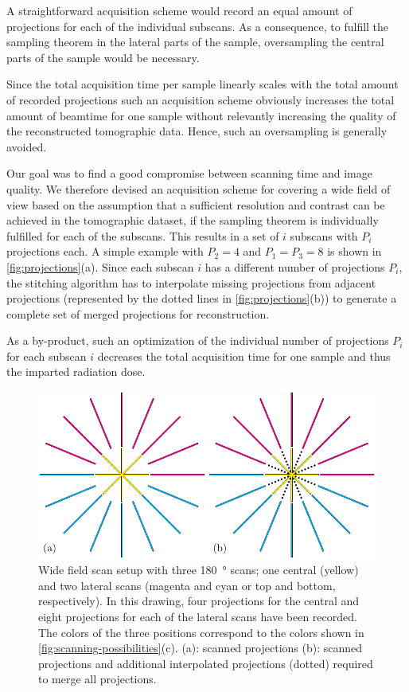 A straightforward acquisition scheme would record an equal amount of projections for each of the individual subscans. As a consequence, to fulfill the sampling theorem in the lateral parts of the sample, oversampling the central parts of the sample would be necessary.

Since the total acquisition time per sample linearly scales with the total amount of recorded projections such an acquisition scheme obviously increases the total amount of beamtime for one sample without relevantly increasing the quality of the reconstructed tomographic data. Hence, such an oversampling is generally avoided.

Our goal was to find a good compromise between scanning time and image quality. We therefore devised an acquisition scheme for covering a wide field of view based on the assumption that a sufficient resolution and contrast can be achieved in the tomographic dataset, if the sampling theorem is individually fulfilled for each of the subscans. This results in a set of $i$ subscans with $P_{i}$ projections each. A simple example with $P_{2}=4$ and $P_{1}=P_{3}=8$ is shown in \autoref{fig:projections}(a). Since each subscan $i$ has a different number of projections $P_{i}$, the stitching algorithm has to interpolate missing projections from adjacent projections (represented by the dotted lines in \autoref{fig:projections}(b)) to generate a complete set of merged projections for reconstruction.

As a by-product, such an optimization of the individual number of projections $P_{i}$ for each subscan $i$ decreases the total acquisition time for one sample and thus the imparted radiation dose.

\begin{figure}
	\centering
	\includegraphics[width=\imsize]{img/Haberthuer2010/Fig02-Interpolation}
	\caption[Wide field scan setup]{Wide field scan setup with three \SI{180}{\degree} scans; one central (yellow) and two lateral scans (magenta and cyan or top and bottom, respectively). In this drawing, four projections for the central and eight projections for each of the lateral scans have been recorded. The colors of the three positions correspond to the colors shown in \autoref{fig:scanning-possibilities}(c). %
	(a): scanned projections %
	(b): scanned projections and additional interpolated projections (dotted) required to merge all projections.}
	\label{fig:projections}
\end{figure}	

